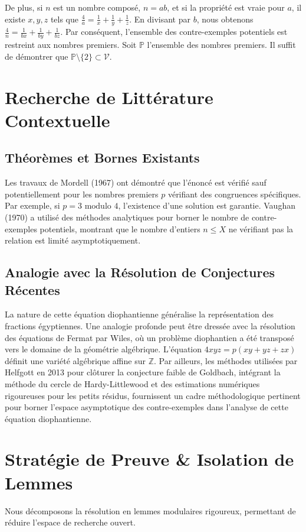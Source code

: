 \documentclass[12pt, a4paper]{article}
\begin{document}
De plus, si $n$ est un nombre compos\'e, $n = ab$, et si la propri\'et\'e est vraie pour $a$, il existe $x, y, z$ tels que $\frac{4}{a} = \frac{1}{x} + \frac{1}{y} + \frac{1}{z}$. En divisant par $b$, nous obtenons $\frac{4}{n} = \frac{1}{bx} + \frac{1}{by} + \frac{1}{bz}$.
Par cons\'equent, l'ensemble des contre-exemples potentiels est restreint aux nombres premiers. Soit $\mathbb{P}$ l'ensemble des nombres premiers. Il suffit de d\'emontrer que $\mathbb{P} \setminus \{2\} \subset \mathcal{V}$.

\newpage
\section{Recherche de Litt\'erature Contextuelle}
\subsection{Th\'eor\`emes et Bornes Existants}
Les travaux de Mordell (1967) ont d\'emontr\'e que l'\'enonc\'e est v\'erifi\'e sauf potentiellement pour les nombres premiers $p$ v\'erifiant des congruences sp\'ecifiques. Par exemple, si $p = 3 \text{ modulo } 4$, l'existence d'une solution est garantie.
Vaughan (1970) a utilis\'e des m\'ethodes analytiques pour borner le nombre de contre-exemples potentiels, montrant que le nombre d'entiers $n \le X$ ne v\'erifiant pas la relation est limit\'e asymptotiquement.

\subsection{Analogie avec la R\'esolution de Conjectures R\'ecentes}
La nature de cette \'equation diophantienne g\'en\'eralise la repr\'esentation des fractions \'egyptiennes.
Une analogie profonde peut \^etre dress\'ee avec la r\'esolution des \'equations de Fermat par Wiles, o\`u un probl\`eme diophantien a \'et\'e transpos\'e vers le domaine de la g\'eom\'etrie alg\'ebrique. L'\'equation $4xyz = p(xy + yz + zx)$ d\'efinit une vari\'et\'e alg\'ebrique affine sur $\mathbb{Z}$.
Par ailleurs, les m\'ethodes utilis\'ees par Helfgott en 2013 pour cl\^oturer la conjecture faible de Goldbach, int\'egrant la m\'ethode du cercle de Hardy-Littlewood et des estimations num\'eriques rigoureuses pour les petits r\'esidus, fournissent un cadre m\'ethodologique pertinent pour borner l'espace asymptotique des contre-exemples dans l'analyse de cette \'equation diophantienne.

\newpage
\section{Strat\'egie de Preuve \& Isolation de Lemmes}
Nous d\'ecomposons la r\'esolution en lemmes modulaires rigoureux, permettant de r\'eduire l'espace de recherche ouvert.
\end{document}
